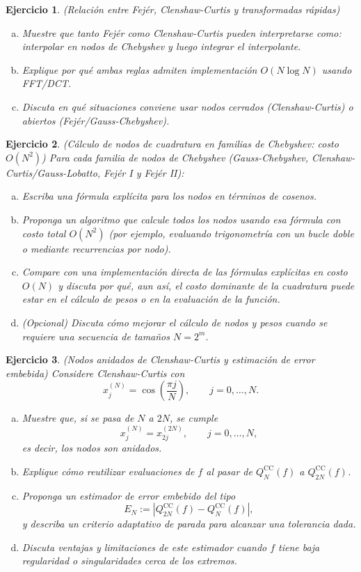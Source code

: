 \documentclass[12pt]{article}
\newtheorem{exercise}{Ejercicio}
\newcommand{\bej}{\begin{exercise}\rm}
\newcommand{\fej}{\end{exercise}}
\begin{document}
\bej
(Relación entre Fejér, Clenshaw-Curtis y transformadas rápidas)
\begin{enumerate}[(a)]
    \item Muestre que tanto Fejér como Clenshaw-Curtis pueden interpretarse como: interpolar en nodos de Chebyshev y luego integrar el interpolante.
    \item Explique por qué ambas reglas admiten implementación $O(N\log N)$ usando FFT/DCT.
    \item Discuta en qué situaciones conviene usar nodos cerrados (Clenshaw-Curtis) o abiertos (Fejér/Gauss-Chebyshev).
\end{enumerate}
\fej

\bej
(Cálculo de nodos de cuadratura en familias de Chebyshev: costo $O(N^2)$)
Para cada familia de nodos de Chebyshev (Gauss-Chebyshev, Clenshaw-Curtis/Gauss-Lobatto, Fejér I y Fejér II):
\begin{enumerate}[(a)]
    \item Escriba una fórmula explícita para los nodos en términos de cosenos.
    \item Proponga un algoritmo que calcule \emph{todos} los nodos usando esa fórmula con costo total $O(N^2)$ (por ejemplo, evaluando trigonometría con un bucle doble o mediante recurrencias por nodo).
    \item Compare con una implementación directa de las fórmulas explícitas en costo $O(N)$ y discuta por qué, aun así, el costo dominante de la cuadratura puede estar en el cálculo de pesos o en la evaluación de la función.
    \item (Opcional) Discuta cómo mejorar el cálculo de nodos y pesos cuando se requiere una secuencia de tamaños $N=2^m$.
\end{enumerate}
\fej

\bej
(Nodos anidados de Clenshaw-Curtis y estimación de error embebida)
Considere Clenshaw-Curtis con
\[
x_j^{(N)}=\cos\left(\frac{\pi j}{N}\right),\qquad j=0,\ldots,N.
\]
\begin{enumerate}[(a)]
    \item Muestre que, si se pasa de $N$ a $2N$, se cumple
    \[
    x_j^{(N)}=x_{2j}^{(2N)},\qquad j=0,\ldots,N,
    \]
    es decir, los nodos son anidados.
    \item Explique cómo reutilizar evaluaciones de $f$ al pasar de $Q_N^{\mathrm{CC}}(f)$ a $Q_{2N}^{\mathrm{CC}}(f)$.
    \item Proponga un estimador de error embebido del tipo
    \[
    E_N:=\left|Q_{2N}^{\mathrm{CC}}(f)-Q_N^{\mathrm{CC}}(f)\right|,
    \]
    y describa un criterio adaptativo de parada para alcanzar una tolerancia dada.
    \item Discuta ventajas y limitaciones de este estimador cuando $f$ tiene baja regularidad o singularidades cerca de los extremos.
\end{enumerate}
\fej
\end{document}
